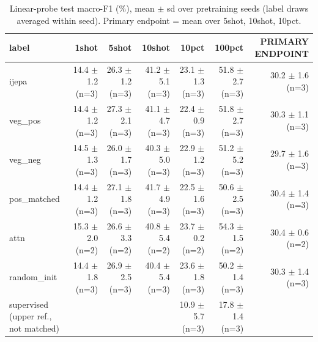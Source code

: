 \begin{table}[t]
\centering
\small
\caption{Linear-probe test macro-F1 (\%), mean $\pm$ sd over pretraining seeds (label draws averaged within seed). Primary endpoint = mean over 5shot, 10shot, 10pct.}
\label{tab:main_results_probe}
\begin{tabular}{lrrrrrr}
\toprule
label & 1shot & 5shot & 10shot & 10pct & 100pct & PRIMARY ENDPOINT \\
\midrule
ijepa & 14.4 $\pm$ 1.2 (n=3) & 26.3 $\pm$ 1.2 (n=3) & 41.2 $\pm$ 5.1 (n=3) & 23.1 $\pm$ 1.3 (n=3) & 51.8 $\pm$ 2.7 (n=3) & 30.2 $\pm$ 1.6 (n=3) \\
veg\_pos & 14.4 $\pm$ 1.2 (n=3) & 27.3 $\pm$ 2.1 (n=3) & 41.1 $\pm$ 4.7 (n=3) & 22.4 $\pm$ 0.9 (n=3) & 51.8 $\pm$ 2.7 (n=3) & 30.3 $\pm$ 1.1 (n=3) \\
veg\_neg & 14.5 $\pm$ 1.3 (n=3) & 26.0 $\pm$ 1.7 (n=3) & 40.3 $\pm$ 5.0 (n=3) & 22.9 $\pm$ 1.2 (n=3) & 51.2 $\pm$ 5.2 (n=3) & 29.7 $\pm$ 1.6 (n=3) \\
pos\_matched & 14.4 $\pm$ 1.2 (n=3) & 27.1 $\pm$ 1.8 (n=3) & 41.7 $\pm$ 4.9 (n=3) & 22.5 $\pm$ 1.6 (n=3) & 50.6 $\pm$ 2.5 (n=3) & 30.4 $\pm$ 1.4 (n=3) \\
attn & 15.3 $\pm$ 2.0 (n=2) & 26.6 $\pm$ 3.3 (n=2) & 40.8 $\pm$ 5.4 (n=2) & 23.7 $\pm$ 0.2 (n=2) & 54.3 $\pm$ 1.5 (n=2) & 30.4 $\pm$ 0.6 (n=2) \\
random\_init & 14.4 $\pm$ 1.8 (n=3) & 26.9 $\pm$ 2.5 (n=3) & 40.4 $\pm$ 5.4 (n=3) & 23.6 $\pm$ 1.8 (n=3) & 50.2 $\pm$ 1.4 (n=3) & 30.3 $\pm$ 1.4 (n=3) \\
supervised (upper ref., not matched) &  &  &  & 10.9 $\pm$ 5.7 (n=3) & 17.8 $\pm$ 1.4 (n=3) &  \\
\bottomrule
\end{tabular}
\end{table}
